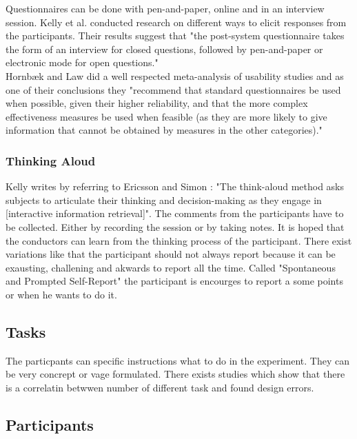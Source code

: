 \documentclass[11pt]{report}
\begin{document}
Questionnaires can be done with pen-and-paper, online and in an interview session. Kelly et al. \cite{Kelly2008} conducted research on different ways to elicit responses from the participants. Their results suggest that "the post-system questionnaire takes the form of an interview for closed questions, followed by pen-and-paper or electronic mode for open questions." \cite{Kelly2008} \\ 

Hornbæk and Law did a well respected meta-analysis of usability studies and as one of their conclusions they "recommend that standard questionnaires be used when possible, given their higher reliability, and that the more complex effectiveness measures be used when feasible (as they are more likely to give information that cannot be obtained by measures in the other categories)." \cite{Hornb2007} 

\subsubsection{Thinking Aloud}

Kelly \cite{Kelly2007} writes by referring to Ericsson and Simon \cite{Ericsson1993}: "The think-aloud method asks subjects to articulate their thinking and decision-making as they engage in [interactive information retrieval]". The comments from the participants have to be collected. Either by recording the session or by taking notes. It is hoped that the conductors can learn from the thinking process of the participant. There exist variations like that the participant should not always report because it can be exausting, challening and akwards to report all the time. Called "Spontaneous and Prompted Self-Report" the participant is encourges to report a some points or when he wants to do it.

\subsection{Tasks}

The particpants can specific instructions what to do in the experiment. They can be very concrept or vage formulated. There exists studies which show that there is a correlatin betwwen number of different task and found design errors.

\subsection{Participants}
\end{document}
